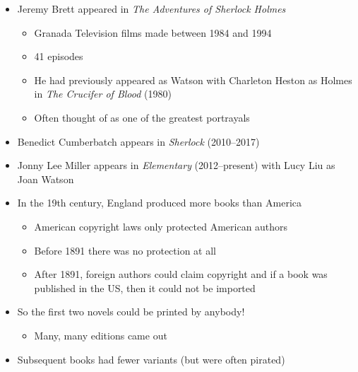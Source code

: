 \documentclass[a4paper,landscape,headrule,footrule,xetex]{foils}
\begin{document}
\begin{itemize}
\item Jeremy Brett appeared in \textit{The Adventures of Sherlock Holmes}
  \begin{itemize}
  \item Granada Television films made between 1984 and 1994
  \item 41 episodes
  \item He had previously appeared as Watson with Charleton Heston as Holmes in \textit{The Crucifer of Blood} (1980)
  \item Often thought of as one of the greatest portrayals
  \end{itemize}
\item Benedict Cumberbatch appears in \textit{Sherlock} (2010–2017) 
\item Jonny Lee Miller 	appears in \textit{Elementary} 	(2012–present) with Lucy Liu as Joan Watson
\end{itemize}





\begin{itemize}
\item In the 19th century, England produced more books than America
  \begin{itemize}
  \item American copyright laws only protected American authors
  \item Before 1891 there was no protection at all
  \item After 1891, foreign authors could claim copyright and if a
    book was published in the US, then it could not be imported
  \end{itemize}
\item So the first two novels could be printed by anybody!
  \begin{itemize}
  \item Many, many editions came out
  \end{itemize}
\item Subsequent books had fewer variants (but were often pirated)
\end{itemize}

\end{document}
